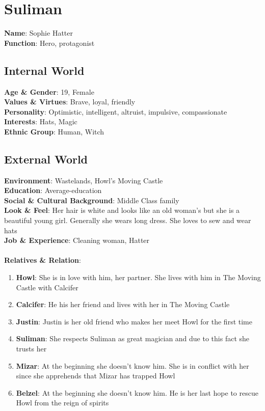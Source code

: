 \section{Suliman}

\textbf{Name}: Sophie Hatter \\
\textbf{Function}: Hero, protagonist

\subsection{Internal World}

\textbf{Age \& Gender}: 19, Female \\
\textbf{Values \& Virtues}: Brave, loyal, friendly \\
\textbf{Personality}: Optimistic, intelligent, altruist, impulsive, compassionate \\
\textbf{Interests}: Hats, Magic \\
\textbf{Ethnic Group}: Human, Witch

\subsection{External World}
\textbf{Environment}: Wastelands, Howl’s Moving Castle \\
\textbf{Education}: Average-education \\
\textbf{Social \& Cultural Background}: Middle Class family \\
\textbf{Look \& Feel}: Her hair is white and looks like an old woman’s but she is a beautiful young girl. Generally she wears long dress. She loves to sew and wear hats \\
\textbf{Job \& Experience}: Cleaning woman, Hatter \\
\\
\textbf{Relatives \& Relation}:
\begin{enumerate}
\item \textbf{Howl}: She is in love with him, her partner. She lives with him in The Moving Castle with Calcifer
\item \textbf{Calcifer}: He his her friend and lives with her in The Moving Castle
\item \textbf{Justin}: Justin is her old friend who makes her meet Howl for the first time
\item \textbf{Suliman}: She respects Suliman as great magician and due to this fact she trusts her
\item \textbf{Mizar}: At the beginning she doesn’t know him. She is in conflict with her since she 
apprehends that Mizar has trapped Howl
\item \textbf{Belzel}: At the beginning she doesn’t know him. He is her last hope to rescue Howl from the reign of spirits
\end{enumerate}

